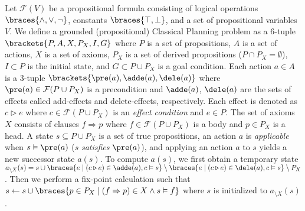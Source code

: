 Let $\mathcal{F}(V)$ be a propositional formula consisting of
 logical operations $\braces{\land,\lor,\lnot}$,
 constants $\braces{\top,\bot}$, and
 a set of propositional variables $V$.
We define a grounded (propositional) Classical Planning problem %
as a 6-tuple $\brackets{P,A,X,P_X,I,G}$
where
 $P$ is a set of propositions,
 $A$ is a set of actions,
 $X$ is a set of axioms,
 $P_X$ is a set of derived propositions ($P\cap P_X=\emptyset$),
 $I\subset P$ is the initial state, and
 $G\subset P\cup P_X$ is a goal condition.
Each action $a\in A$ is a 3-tuple $\brackets{\pre(a),\adde(a),\dele(a)}$ where
 $\pre(a) \in \mathcal{F}(P\cup P_X)$ is a precondition and
 $\adde(a)$, $\dele(a)$ are the sets of effects called add-effects and delete-effects, respectively.
Each effect is denoted as $c \triangleright e$ where
 $c \in \mathcal{F}(P\cup P_X)$ is an \emph{effect condition} and
 $e \in P$.
The set of axioms $X$ consists of clauses $f \Rightarrow p$ where
 $f \in \mathcal{F}(P\cup P_X)$ is a body and
 $p \in P_X$ is a head.
A state $s\subseteq P\cup P_X$ is a set of true propositions,
an action $a$ is \emph{applicable} when $s \vDash \pre(a)$ ($s$ \emph{satisfies} $\pre(a)$),
and applying an action $a$ to $s$ yields a new successor state $a(s)$.
To compute $a(s)$, we first obtain a temporary state
$a_{\setminus X}(s) = s
 \cup      \braces{e \mid (c \triangleright e) \in \adde(a), c\vDash s}
 \setminus \braces{e \mid (c \triangleright e) \in \dele(a), c\vDash s}
 \setminus P_X $.
Then we perform a fix-point calculation such that
$s \gets s \cup \braces{p \in P_X \mid (f\Rightarrow p)\in X \land s \vDash f}$
where $s$ is initialized to $a_{\setminus X}(s)$.
